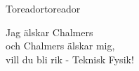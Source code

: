 \begin{song}{Toreador}{toreador}
\begin{vers}
Jag älskar Chalmers\\
och Chalmers älskar mig,\\
vill du bli rik - Teknisk Fysik!\\
\end{vers}
\end{song}
